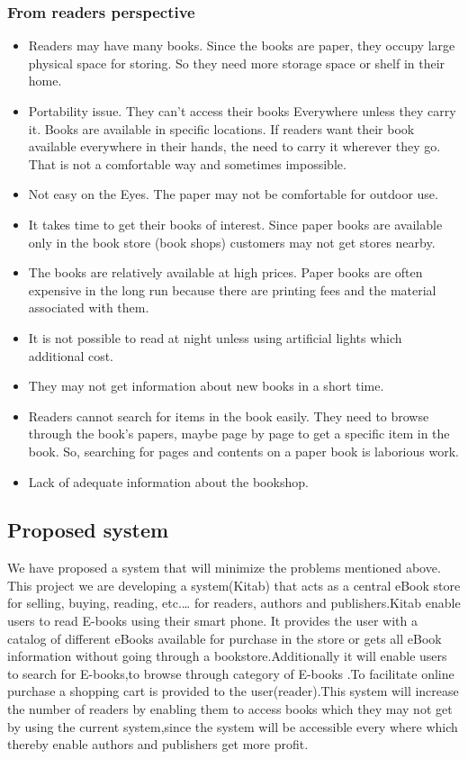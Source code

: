 		\subsubsection{From readers perspective}

\begin{itemize}
	\item Readers may have many books. Since the books are paper, they occupy large physical space for storing. So they need more storage space or shelf in their home.
	\item Portability issue. They can’t access their books Everywhere unless they carry it. Books are available in specific locations. If readers want their book available everywhere in their hands, the need to carry it wherever they go. That is not a comfortable way and sometimes impossible.
	\item Not easy on the Eyes. The paper may not be comfortable for outdoor use.
	\item It takes time to get their books of interest. Since paper books are available only in the book store (book shops) customers may not get stores nearby.
	\item The books are relatively available at high prices. Paper books are often expensive in the long run because there are printing fees and the material associated with them.
	\item It is not possible to read at night unless using artificial lights which additional cost.
	\item They may not get information about new books in a short time.
	\item Readers cannot search for items in the book easily. They need to browse through the book's papers, maybe page by page to get a specific item in the book. So, searching for pages and contents on a paper book is laborious work.
	\item Lack of adequate information about the bookshop.
\end{itemize}

		\subsection{Proposed system}

We have proposed a system that will minimize the problems mentioned above. This project we are developing  a system(Kitab) that acts as a central eBook store for selling, buying, reading, etc.… for readers, authors and publishers.Kitab enable users to read E-books using their smart phone. It provides the user with a catalog of different eBooks available for purchase in the store or gets all eBook information without going through a bookstore.Additionally it will enable users to search for E-books,to browse through category of E-books .To facilitate online purchase a shopping cart is provided to the user(reader).This system will increase the number of readers by enabling them to access books which they may not get by using the current system,since the system will be accessible every where which thereby enable authors and publishers get more profit.

